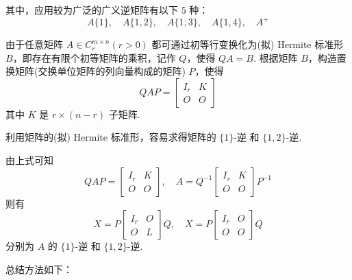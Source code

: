             \par 其中，应用较为广泛的广义逆矩阵有以下 $5$ 种：
            \begin{equation*}
                A\{1\}, \quad A\{1,2\}, \quad A\{1,3\}, \quad A\{1,4\}, \quad A^{+}
            \end{equation*}
            \par 由于任意矩阵 $A \in C_r^{m \times n}(r > 0)$ 都可通过初等行变换化为(拟) Hermite 标准形 $B$，即存在有限个初等矩阵的乘积，记作 $Q$，使得 $QA = B$. 根据矩阵 $B$，构造置换矩阵(交换单位矩阵的列向量构成的矩阵) $P$，使得
            \begin{equation*}
                QAP = \begin{bmatrix}
                    I_r & K \\ O & O
                \end{bmatrix}
            \end{equation*}
            其中 $K$ 是 $r \times (n-r)$ 子矩阵.
            \par 利用矩阵的(拟) Hermite 标准形，容易求得矩阵的 $\{1\}$-逆 和 $\{1,2\}$-逆.
            \\
            \par 由上式可知
            \begin{equation*}
                QAP = \begin{bmatrix}
                    I_r & K \\ O & O
                \end{bmatrix}, \quad A = Q^{-1}\begin{bmatrix}
                    I_r & K \\ O & O
                \end{bmatrix}P^{-1}
            \end{equation*}
            则有 
            \begin{equation*}
                X = P\begin{bmatrix}
                    I_r & O \\ O & L
                \end{bmatrix}Q, \quad X = P\begin{bmatrix}
                    I_r & O \\ O & O
                \end{bmatrix}Q
            \end{equation*}
            分别为 $A$ 的 $\{1\}$-逆 和 $\{1,2\}$-逆.
            \\
            \par 总结方法如下：
